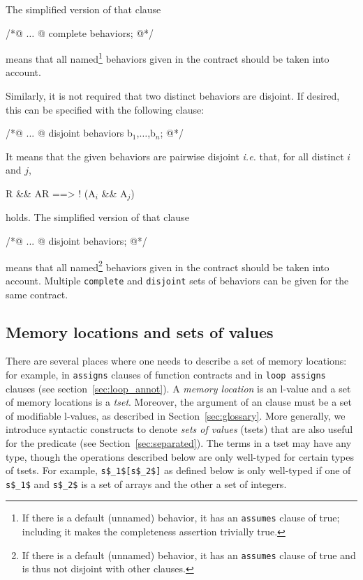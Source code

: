 The simplified version of that clause
\begin{listing-nonumber}
/*@ $\dots$
  @ complete behaviors;
  @*/
\end{listing-nonumber}
means that all named\footnote{If there is a default (unnamed) behavior, it has an
	\lstinline|assumes| clause of true; including it makes the
	completeness assertion trivially true.} behaviors given in the contract should be taken into account.

Similarly, it is not required that two distinct behaviors are disjoint.
If desired, this can be specified with the following clause:
\begin{listing-nonumber}
/*@ ...
  @ disjoint behaviors b$_1$,$\dots$,b$_n$;
  @*/
\end{listing-nonumber}
It means that the given behaviors are pairwise disjoint \emph{i.e.}
that, for all distinct $i$ and $j$,
\begin{listing-nonumber}
R && AR ==> ! (A$_i$ && A$_j$)
\end{listing-nonumber}
holds.
The simplified version of that clause
\begin{listing-nonumber}
/*@ ...
  @ disjoint behaviors;
  @*/
\end{listing-nonumber}
means that all named\footnote{If there is a default (unnamed) behavior, it has an
\lstinline|assumes| clause of true and is thus not disjoint with other clauses.} behaviors given in the contract should be taken into account.
Multiple \lstinline|complete| and \lstinline|disjoint| sets of behaviors can
be given for the same contract.

\subsection{Memory locations and sets of values}
\label{sec:locations}

There are several places where one needs to describe a set of memory
locations: for example, in \lstinline|assigns| clauses of function contracts and
in \lstinline|loop assigns| clauses (see section~\ref{sec:loop_annot}).
A \emph{memory location} is an
l-value and a set of memory locations is a \emph{tset}.
Moreover, the argument of
an \assigns{} clause must be a set of modifiable l-values, as described in
Section~\ref{sec:glossary}.
More generally, we introduce syntactic constructs to denote \emph{sets of
  values} (tsets) that are also useful for the \separated predicate (see Section~\ref{sec:separated}). The terms in a tset may have any type, though the operations described below are only well-typed for certain types of tsets. For example, \lstinline|s$_1$[s$_2$]| as defined below is only well-typed if one of
\lstinline|s$_1$| and \lstinline|s$_2$| is a set of arrays and the other a set of integers.

